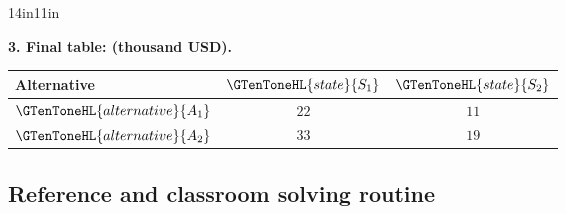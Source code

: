 \begin{CalculationLandscape}{14in}{11in}
\noindent\begin{minipage}{\linewidth}
\textbf{3. Final  table:  (thousand USD).}
\begin{center}
\begin{tabular}{@{}lcc@{}}
\toprule
Alternative & \(\GTenToneHL{state}{S_1}\) & \(\GTenToneHL{state}{S_2}\) \\
\midrule
\(\GTenToneHL{alternative}{A_1}\) & \(22\) & \(11\) \\
\(\GTenToneHL{alternative}{A_2}\) & \(33\) & \(19\) \\
\bottomrule
\end{tabular}
\end{center}
\end{minipage}



\end{CalculationLandscape}


\subsection{Reference and classroom solving routine}
\label{subsec:intro-reference}

